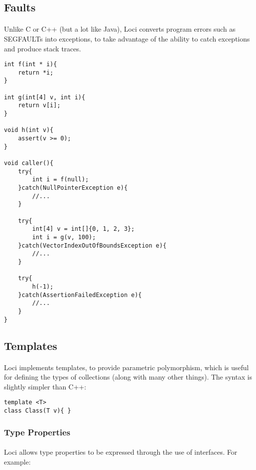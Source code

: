 \documentclass[12pt,twoside,notitlepage]{report}
\begin{document}
\clearpage

\subsection{Faults}

\paragraph{}
Unlike C or C++ (but a lot like Java), Loci converts program errors such as SEGFAULTs into exceptions, to take advantage of the ability to catch exceptions and produce stack traces.


\begin{lstlisting}
int f(int * i){
	return *i;
}

int g(int[4] v, int i){
	return v[i];
}

void h(int v){
	assert(v >= 0);
}

void caller(){
	try{
		int i = f(null);
	}catch(NullPointerException e){
		//...
	}
	
	try{
		int[4] v = int[]{0, 1, 2, 3};
		int i = g(v, 100);
	}catch(VectorIndexOutOfBoundsException e){
		//...
	}
	
	try{
		h(-1);
	}catch(AssertionFailedException e){
		//...
	}
}
\end{lstlisting}


\clearpage

\subsection{Templates}

\paragraph{}
Loci implements templates, to provide parametric polymorphism, which is useful for defining the types of collections (along with many other things). The syntax is slightly simpler than C++:

\begin{lstlisting}
template <T>
class Class(T v){ }
\end{lstlisting}


\subsubsection{Type Properties}

\paragraph{}
Loci allows type properties to be expressed through the use of interfaces. For example:
\end{document}

